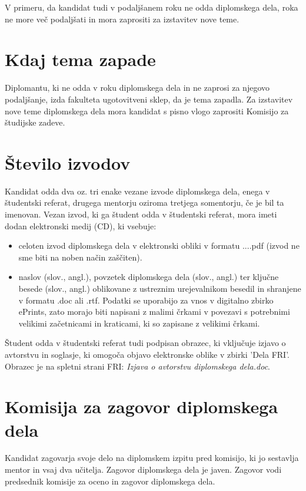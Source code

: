 \documentclass[12pt,a4paper]{book}
\begin{document}
V primeru, da kandidat tudi v podaljšanem roku ne odda diplomskega dela, roka ne more več podaljšati in mora zaprositi za izstavitev nove teme.

\section{Kdaj tema zapade}
Diplomantu, ki ne odda v roku diplomskega dela in ne zaprosi za njegovo podaljšanje, izda fakulteta ugotovitveni sklep, da je tema zapadla. Za
izstavitev nove teme diplomskega dela mora kandidat s pisno vlogo zaprositi Komisijo za študijske zadeve.

\section{\v Stevilo izvodov}
Kandidat odda dva oz. tri enake vezane izvode diplomskega dela, enega v študentski referat, drugega mentorju oziroma tretjega somentorju, če je
bil ta imenovan. Vezan izvod, ki ga študent odda v študentski referat, mora imeti dodan elektronski medij (CD), ki vsebuje:
\begin{itemize}
	\item celoten izvod diplomskega dela v elektronski obliki v formatu ....pdf (izvod ne sme biti na noben način zaščiten).
	\item naslov (slov., angl.), povzetek diplomskega dela (slov., angl.) ter ključne besede (slov., angl.) oblikovane  z ustreznim urejevalnikom besedil in shranjene v formatu .doc ali .rtf. Podatki se uporabijo za vnos v digitalno zbirko ePrints, zato morajo biti napisani z malimi črkami v povezavi s potrebnimi velikimi začetnicami in kraticami, ki so zapisane z velikimi črkami. 
\end{itemize}

Študent odda v študentski referat tudi podpisan obrazec, ki vključuje izjavo o avtorstvu in soglasje, ki omogoča objavo elektronske oblike v zbirki 'Dela FRI'. Obrazec je na spletni strani FRI: \textit{Izjava o avtorstvu diplomskega dela.doc}. 


\section{Komisija za zagovor diplomskega dela}
Kandidat zagovarja svoje delo na diplomskem izpitu pred komisijo, ki jo se\-stav\-lja mentor in vsaj dva učitelja. Zagovor diplomskega dela je
javen. Zagovor vodi predsednik komisije za oceno in zagovor diplomskega dela. 
\end{document}
